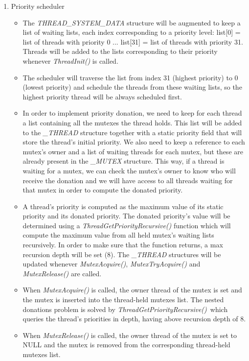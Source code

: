 \documentclass{report}
\begin{document}
\begin{enumerate}
	\item Priority scheduler
        \begin{itemize}
			\item The \textit {THREAD\_SYSTEM\_DATA} structure will be augmented to keep a list of waiting lists, each index corresponding to a priority level:
				  list[0] = list of threads with priority 0 ... list[31] = list of threads with priority 31. Threads will be added to the lists corresponding
				  to their priority whenever \textit{ThreadInit()} is called. 
			\item The scheduler will traverse the list from index 31 (highest priority) to 0 (lowest priority) and schedule the threads from these 
			      waiting lists, so the highest priority thread will be always scheduled first.
			\item In order to implement priority donation, we need to keep for each thread a list containing all the mutexes the thread holds. This list
				  will be added to the \textit{\_THREAD} structure together with a static priority field that will store the thread's initial priority.
				  We also need to keep a reference to each mutex's owner and a list of waiting threads for each mutex, but these are
				  already present in the \textit{\_MUTEX} structure. This way, if a thread is waiting for a mutex, we can check the mutex's owner
				  to know who will receive the donation and we will have access to all threads waiting for that mutex in order to compute the donated priority.
			\item A thread's priority is computed as the maximum value of its static priority and its donated priority. 
				  The donated priority's value will be determined using a \textit{ThreadGetPriorityRecursive()} function which will compute the maximum value 
				  from all held mutex's waiting lists recursively. In order to make sure that the function returns, a max recursion depth will be set (8).
				  The \textit{\_THREAD} structures will be updated whenever \textit{MutexAcquire()}, \textit{MutexTryAcquire()} and \textit{MutexRelease()} are called.
		   \item  When \textit{MutexAcquire()} is called, the owner thread of the mutex is set and the mutex is inserted into the thread-held mutexes list.
				  The nested donations problem is solved by \textit{ThreadGetPriorityRecursive()}\ which queries the thread's priorities in depth, having above
				  recursion depth of 8.
		   \item When \textit{MutexRelease()} is called, the owner thread of the mutex is set to NULL and the mutex is removed from the corresponding thread-held mutexes list.

\end{itemize}
\end{enumerate}
\end{document}

